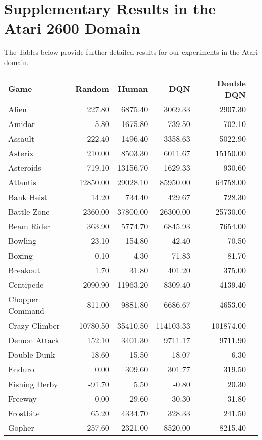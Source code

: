 \documentclass[letterpaper]{article}
\begin{document}
\section*{Supplementary Results in the Atari 2600 Domain}
The Tables below provide further detailed results for our experiments in the Atari domain.



\begin{table*}[h]
\centering
\begin{tabular}{lrrrrr}
\textbf{Game} & \textbf{Random} & \textbf{Human} & \textbf{DQN} & \textbf{Double DQN} \\
Alien & 227.80 & 6875.40 & 3069.33 & 2907.30 \\
Amidar & 5.80 & 1675.80 & 739.50 & 702.10 \\
Assault & 222.40 & 1496.40 & 3358.63 & 5022.90 \\
Asterix & 210.00 & 8503.30 & 6011.67 & 15150.00 \\
Asteroids & 719.10 & 13156.70 & 1629.33 & 930.60 \\
Atlantis & 12850.00 & 29028.10 & 85950.00 & 64758.00 \\
Bank Heist & 14.20 & 734.40 & 429.67 & 728.30 \\
Battle Zone & 2360.00 & 37800.00 & 26300.00 & 25730.00 \\
Beam Rider & 363.90 & 5774.70 & 6845.93 & 7654.00 \\
Bowling & 23.10 & 154.80 & 42.40 & 70.50 \\
Boxing & 0.10 & 4.30 & 71.83 & 81.70 \\
Breakout & 1.70 & 31.80 & 401.20 & 375.00 \\
Centipede & 2090.90 & 11963.20 & 8309.40 & 4139.40 \\
Chopper Command & 811.00 & 9881.80 & 6686.67 & 4653.00 \\
Crazy Climber & 10780.50 & 35410.50 & 114103.33 & 101874.00 \\
Demon Attack & 152.10 & 3401.30 & 9711.17 & 9711.90 \\
Double Dunk & -18.60 & -15.50 & -18.07 & -6.30 \\
Enduro & 0.00 & 309.60 & 301.77 & 319.50 \\
Fishing Derby & -91.70 & 5.50 & -0.80 & 20.30 \\
Freeway & 0.00 & 29.60 & 30.30 & 31.80 \\
Frostbite & 65.20 & 4334.70 & 328.33 & 241.50 \\
Gopher & 257.60 & 2321.00 & 8520.00 & 8215.40 \\

\end{tabular}
\end{table*}
\end{document}
